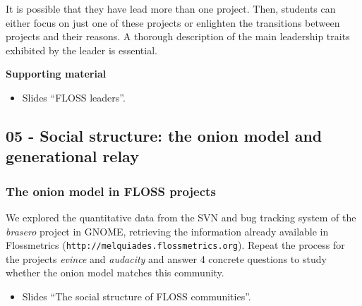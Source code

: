 \documentclass[a4paper]{article}
\begin{document}
It is possible that they have lead more than one project. Then, students can either focus on just one of these projects or enlighten the transitions between 
projects and their reasons. A thorough description of the main leadership traits exhibited by the leader is essential.

\textbf{Supporting material}

\begin{itemize}
\item Slides ``FLOSS leaders''.
\end{itemize}

\subsection{05 - Social structure: the onion model and generational relay}

\subsubsection{The onion model in FLOSS projects}
\label{sub:empirical-onion}
 
We explored the quantitative data from the SVN and bug tracking system of the 
\textit{brasero} project in GNOME, retrieving the information
already available in Flossmetrics (\texttt{http://melquiades.flossmetrics.org}). 
Repeat the process for the projects \textit{evince} and \textit{audacity} and
answer 4 concrete questions to study whether the onion model matches this 
community.

\begin{itemize}
\item Slides ``The social structure of FLOSS communities''.
\end{itemize}
\end{document}
